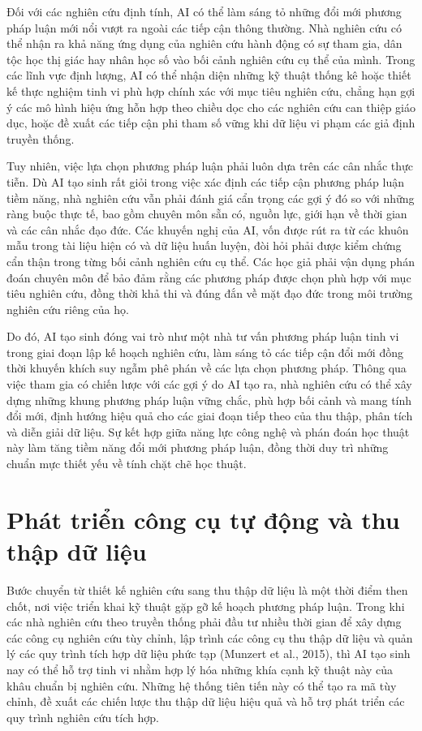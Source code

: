 Đối với các nghiên cứu định tính, AI có thể làm sáng tỏ những đổi mới phương pháp luận mới nổi vượt ra ngoài các tiếp cận thông thường. Nhà nghiên cứu có thể nhận ra khả năng ứng dụng của nghiên cứu hành động có sự tham gia, dân tộc học thị giác hay nhân học số vào bối cảnh nghiên cứu cụ thể của mình. Trong các lĩnh vực định lượng, AI có thể nhận diện những kỹ thuật thống kê hoặc thiết kế thực nghiệm tinh vi phù hợp chính xác với mục tiêu nghiên cứu, chẳng hạn gợi ý các mô hình hiệu ứng hỗn hợp theo chiều dọc cho các nghiên cứu can thiệp giáo dục, hoặc đề xuất các tiếp cận phi tham số vững khi dữ liệu vi phạm các giả định truyền thống.

Tuy nhiên, việc lựa chọn phương pháp luận phải luôn dựa trên các cân nhắc thực tiễn. Dù AI tạo sinh rất giỏi trong việc xác định các tiếp cận phương pháp luận tiềm năng, nhà nghiên cứu vẫn phải đánh giá cẩn trọng các gợi ý đó so với những ràng buộc thực tế, bao gồm chuyên môn sẵn có, nguồn lực, giới hạn về thời gian và các cân nhắc đạo đức. Các khuyến nghị của AI, vốn được rút ra từ các khuôn mẫu trong tài liệu hiện có và dữ liệu huấn luyện, đòi hỏi phải được kiểm chứng cẩn thận trong từng bối cảnh nghiên cứu cụ thể. Các học giả phải vận dụng phán đoán chuyên môn để bảo đảm rằng các phương pháp được chọn phù hợp với mục tiêu nghiên cứu, đồng thời khả thi và đúng đắn về mặt đạo đức trong môi trường nghiên cứu riêng của họ.

Do đó, AI tạo sinh đóng vai trò như một nhà tư vấn phương pháp luận tinh vi trong giai đoạn lập kế hoạch nghiên cứu, làm sáng tỏ các tiếp cận đổi mới đồng thời khuyến khích suy ngẫm phê phán về các lựa chọn phương pháp. Thông qua việc tham gia có chiến lược với các gợi ý do AI tạo ra, nhà nghiên cứu có thể xây dựng những khung phương pháp luận vững chắc, phù hợp bối cảnh và mang tính đổi mới, định hướng hiệu quả cho các giai đoạn tiếp theo của thu thập, phân tích và diễn giải dữ liệu. Sự kết hợp giữa năng lực công nghệ và phán đoán học thuật này làm tăng tiềm năng đổi mới phương pháp luận, đồng thời duy trì những chuẩn mực thiết yếu về tính chặt chẽ học thuật.

\section{Phát triển công cụ tự động và thu thập dữ liệu}

Bước chuyển từ thiết kế nghiên cứu sang thu thập dữ liệu là một thời điểm then chốt, nơi việc triển khai kỹ thuật gặp gỡ kế hoạch phương pháp luận. Trong khi các nhà nghiên cứu theo truyền thống phải đầu tư nhiều thời gian để xây dựng các công cụ nghiên cứu tùy chỉnh, lập trình các công cụ thu thập dữ liệu và quản lý các quy trình tích hợp dữ liệu phức tạp (Munzert et al., 2015), thì AI tạo sinh nay có thể hỗ trợ tinh vi nhằm hợp lý hóa những khía cạnh kỹ thuật này của khâu chuẩn bị nghiên cứu. Những hệ thống tiên tiến này có thể tạo ra mã tùy chỉnh, đề xuất các chiến lược thu thập dữ liệu hiệu quả và hỗ trợ phát triển các quy trình nghiên cứu tích hợp.


